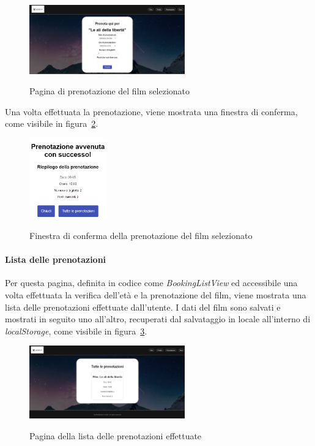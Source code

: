 \begin{figure}[ht]
    \centering
    \includegraphics[width=0.6\textwidth, alt={Schermata della pagina di prenotazione del film selezionato}]{immagini/frontend/movie-booking.png}
    \caption{Pagina di prenotazione del film selezionato}\label{fig:prenotazione-film}
\end{figure}

\newpage

Una volta effettuata la prenotazione, viene mostrata una finestra di conferma, come visibile in figura~\ref{fig:conferma-prenotazione}.
\begin{figure}[ht]
    \centering
    \includegraphics[width=0.3\textwidth, alt={Schermata della pagina di conferma della prenotazione del film selezionato}]{immagini/frontend/movie-booking-done.png}
    \caption{Finestra di conferma della prenotazione del film selezionato}\label{fig:conferma-prenotazione}
\end{figure}

\paragraph{Lista delle prenotazioni}\label{par:lista-prenotazioni}
Per questa pagina, definita in codice come \textit{BookingListView} ed accessibile una volta effettuata la verifica dell'età e la prenotazione del film, viene mostrata una lista delle prenotazioni effettuate dall'utente.
I dati del film sono salvati e mostrati in seguito uno all'altro, recuperati dal salvataggio in locale all'interno di \textit{localStorage}, come visibile in figura~\ref{fig:lista-prenotazioni}.

\begin{figure}[ht]
    \centering
    \includegraphics[width=0.6\textwidth, alt={Schermata della pagina di lista delle prenotazioni effettuate}]{immagini/frontend/movie-booking-list.png}
    \caption{Pagina della lista delle prenotazioni effettuate}\label{fig:lista-prenotazioni}
\end{figure}

